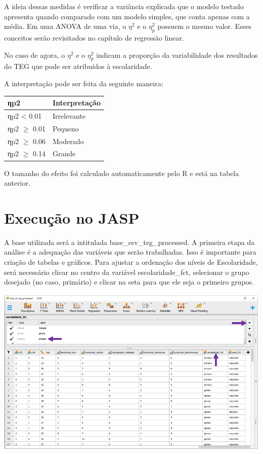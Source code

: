 \documentclass[
]{book}
\begin{document}
A ideia dessas medidas é verificar a variância explicada que o modelo
testado apresenta quando comparado com um modelo simples, que conta
apenas com a média. Em uma ANOVA de uma via, o \(\eta^2\) e o
\(\eta_p^2\) possuem o mesmo valor. Esses conceitos serão revisitados no
capítulo de regressão linear.

No caso de agora, o \(\eta^2\) e o \(\eta_p^2\) indicam a proporção da
variabilidade dos resultados do TEG que pode ser atribuídos à
escolaridade.

A interpretação pode ser feita da seguinte maneira:

\begin{longtable}[]{@{}ll@{}}
\toprule
ηp2 & Interpretação\tabularnewline
\midrule
\endhead
ηp2 \textless{} 0.01 & Irrelevante\tabularnewline
ηp2 \(\geq\) 0.01 & Pequeno\tabularnewline
ηp2 \(\geq\) 0.06 & Moderado\tabularnewline
ηp2 \(\geq\) 0.14 & Grande\tabularnewline
\bottomrule
\end{longtable}

O tamanho do efeito foi calculado automaticamente pelo R e está na
tabela anterior.

\hypertarget{execuuxe7uxe3o-no-jasp-5}{%
\section{Execução no JASP}\label{execuuxe7uxe3o-no-jasp-5}}

A base utilizada será a intitulada base\_csv\_teg\_processed. A primeira
etapa da análise é a adequação das variáveis que serão trabalhadas. Isso
é importante para criação de tabelas e gráficos. Para ajustar a
ordenação dos níveis de Escolaridade, será necessário clicar no centro
da variável escolaridade\_fct, selecionar o grupo desejado (no caso,
primário) e clicar na seta para que ele seja o primeiro grupos.

\includegraphics{./img/cap_anova_ordem_variaveis.png}
\end{document}
